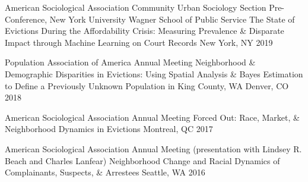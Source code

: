 \begin{cventries}
    
  \cventry
    {American Sociological Association Community Urban Sociology Section Pre-Conference, New York University Wagner School of Public Service} %
    {The State of Evictions During the Affordability Crisis: Measuring Prevalence \& Disparate Impact through Machine Learning on Court Records} %
    {New York, NY} %
    {2019} %
    {}
    
    
  \cventry
    {Population Association of America Annual Meeting} %
    {Neighborhood \& Demographic Disparities in Evictions: Using Spatial Analysis \& Bayes Estimation to Define a Previously Unknown Population in King County, WA} %
    {Denver, CO} %
    {2018} %
    {}
    
    
  \cventry
    {American Sociological Association Annual Meeting} %
    {Forced Out: Race, Market, \& Neighborhood Dynamics in Evictions} %
    {Montreal, QC} %
    {2017} %
    {}

  \cventry
    {American Sociological Association Annual Meeting (presentation with Lindsey R. Beach and Charles Lanfear)} %
    {Neighborhood Change and Racial Dynamics of Complainants, Suspects, \& Arrestees} %
    {Seattle, WA} %
    {2016} %
    {}



\end{cventries}
